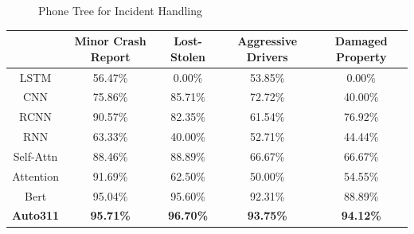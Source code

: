 \begin{figure}[ht]
\centering
{}
\caption{Phone Tree for Incident Handling} 
\label{fig:phone_tree}
\end{figure}

\begin{table}[]
\footnotesize
\begin{tabular}{||c|c|c|c|c||}
\hline
          & Minor Crash Report & Lost-Stolen & Aggressive Drivers & Damaged Property \\ \hline\hline
LSTM      & 56.47\%            & 0.00\%      & 53.85\%            & 0.00\%           \\ \hline
CNN       & 75.86\%            & 85.71\%     & 72.72\%            & 40.00\%          \\ \hline
RCNN      & 90.57\%            & 82.35\%     & 61.54\%            & 76.92\%          \\ \hline
RNN       & 63.33\%            & 40.00\%     & 52.71\%            & 44.44\%          \\ \hline
Self-Attn & 88.46\%            & 88.89\%     & 66.67\%            & 66.67\%          \\ \hline
Attention & 91.69\%            & 62.50\%     & 50.00\%            & 54.55\%          \\ \hline
Bert      & 95.04\%            & 95.60\%     & 92.31\%            & 88.89\%          \\ \hline
\textbf{Auto311}   & \textbf{95.71\%}            & \textbf{96.70\%}     & \textbf{93.75\%}            & \textbf{94.12\%}          \\ \hline
\end{tabular}
\end{table}